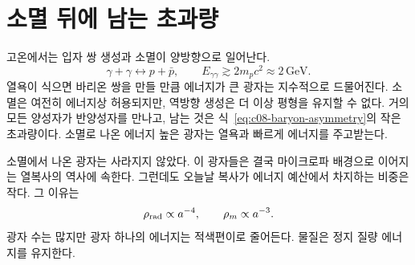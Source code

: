 \section{소멸 뒤에 남는 초과량}

고온에서는 입자 쌍 생성과 소멸이 양방향으로 일어난다.
\begin{equation}
\gamma+\gamma\longleftrightarrow p+\bar p,
\qquad
E_{\gamma\gamma}\gtrsim2m_pc^2\approx2\,\mathrm{GeV}.
\end{equation}
열욕이 식으면 바리온 쌍을 만들 만큼 에너지가 큰 광자는 지수적으로 드물어진다. 소멸은 여전히 에너지상 허용되지만, 역방향 생성은 더 이상 평형을 유지할 수 없다. 거의 모든 양성자가 반양성자를 만나고, 남는 것은 식~\eqref{eq:c08-baryon-asymmetry}의 작은 초과량이다. 소멸로 나온 에너지 높은 광자는 열욕과 빠르게 에너지를 주고받는다.

\begin{classroomqa}
\end{classroomqa}

\begin{classroomqa}
\end{classroomqa}

소멸에서 나온 광자는 사라지지 않았다. 이 광자들은 결국 마이크로파 배경으로 이어지는 열복사의 역사에 속한다. 그런데도 오늘날 복사가 에너지 예산에서 차지하는 비중은 작다. 그 이유는
\begin{equation}
\rho_{\rm rad}\propto a^{-4},
\qquad
\rho_m\propto a^{-3}.
\end{equation}
광자 수는 많지만 광자 하나의 에너지는 적색편이로 줄어든다. 물질은 정지 질량 에너지를 유지한다.

\begin{classroomqa}
\end{classroomqa}

